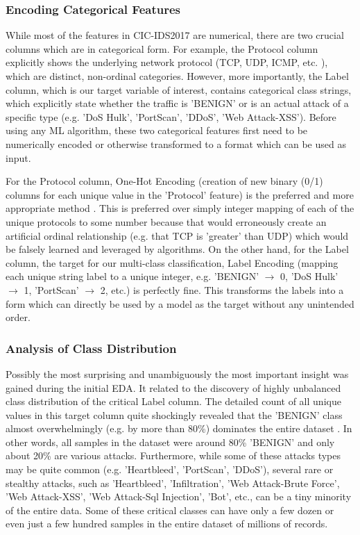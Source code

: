 \subsubsection{Encoding Categorical Features} 
While most of the features in CIC-IDS2017 are numerical, there are two crucial columns which are in categorical form. For example, the Protocol column explicitly shows the underlying network protocol (TCP, UDP, ICMP, etc. ), which are distinct, non-ordinal categories. However, more importantly, the Label column, which is our target variable of interest, contains categorical class strings, which explicitly state whether the traffic is 'BENIGN' or is an actual attack of a specific type (e.g. 'DoS Hulk', 'PortScan', 'DDoS', 'Web Attack-XSS'). Before using any ML algorithm, these two categorical features first need to be numerically encoded or otherwise transformed to a format which can be used as input.

For the Protocol column, One-Hot Encoding (creation of new binary (0/1) columns for each unique value in the 'Protocol' feature) is the preferred and more appropriate method \parencite{al2020survey}. This is preferred over simply integer mapping of each of the unique protocols to some number because that would erroneously create an artificial ordinal relationship (e.g. that TCP is 'greater' than UDP) which would be falsely learned and leveraged by algorithms. On the other hand, for the Label column, the target for our multi-class classification, Label Encoding (mapping each unique string label to a unique integer, e.g. 'BENIGN' $\rightarrow$ 0, 'DoS Hulk' $\rightarrow$ 1, 'PortScan' $\rightarrow$ 2, etc.) is perfectly fine. This transforms the labels into a form which can directly be used by a model as the target without any unintended order.

\subsubsection{Analysis of Class Distribution} 
Possibly the most surprising and unambiguously the most important insight was gained during the initial EDA. It related to the discovery of highly unbalanced class distribution of the critical Label column. The detailed count of all unique values in this target column quite shockingly revealed that the 'BENIGN' class almost overwhelmingly (e.g. by more than 80\%) dominates the entire dataset \parencite{mahfouz2022systematic}. In other words, all samples in the dataset were around 80\% 'BENIGN' and only about 20\% are various attacks. Furthermore, while some of these attacks types may be quite common (e.g. 'Heartbleed', 'PortScan', 'DDoS'), several rare or stealthy attacks, such as 'Heartbleed', 'Infiltration', 'Web Attack-Brute Force', 'Web Attack-XSS', 'Web Attack-Sql Injection', 'Bot', etc., can be a tiny minority of the entire data. Some of these critical classes can have only a few dozen or even just a few hundred samples in the entire dataset of millions of records.

